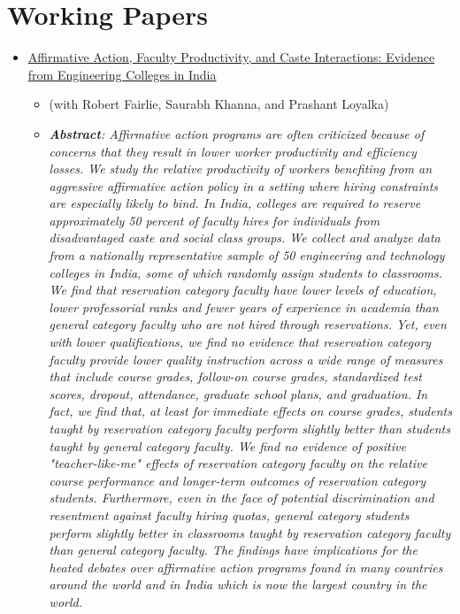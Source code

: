 \documentclass[letter,10pt]{article}
\begin{document}
\section{Working Papers}
\begin{itemize}
    \item \href{https://gagandeep-sachdeva.com/AA_FKLS_Sep24.pdf}{Affirmative Action, Faculty Productivity, and Caste Interactions: Evidence from Engineering Colleges in India} 
        \begin{itemize}
            \item[] \small{(with Robert Fairlie, Saurabh Khanna, and Prashant Loyalka)}
            \item[] \small{\textit{\textbf{Abstract}: Affirmative action programs are often criticized because of concerns that they result in lower worker productivity and efficiency losses. We study the relative productivity of workers benefiting from an aggressive affirmative action policy in a setting where hiring constraints are especially likely to bind. In India, colleges are required to reserve approximately 50 percent of faculty hires for individuals from disadvantaged caste and social class groups. We collect and analyze data from a nationally representative sample of 50 engineering and technology colleges in India, some of which randomly assign students to classrooms. We find that reservation category faculty have lower levels of education, lower professorial ranks and fewer years of experience in academia than general category faculty who are not hired through reservations. Yet, even with lower qualifications, we find no evidence that reservation category faculty provide lower quality instruction across a wide range of measures that include course grades, follow-on course grades, standardized test scores, dropout, attendance, graduate school plans, and graduation. In fact, we find that, at least for immediate effects on course grades, students taught by reservation category faculty perform slightly better than students taught by general category faculty. We find no evidence of positive "teacher-like-me" effects of reservation category faculty on the relative course performance and longer-term outcomes of reservation category students. Furthermore, even in the face of potential discrimination and resentment against faculty hiring quotas, general category students perform slightly better in classrooms taught by reservation category faculty than general category faculty. The findings have implications for the heated debates over affirmative action programs found in many countries around the world and in India which is now the largest country in the world.}}

\end{itemize}
\end{itemize}
\end{document}
